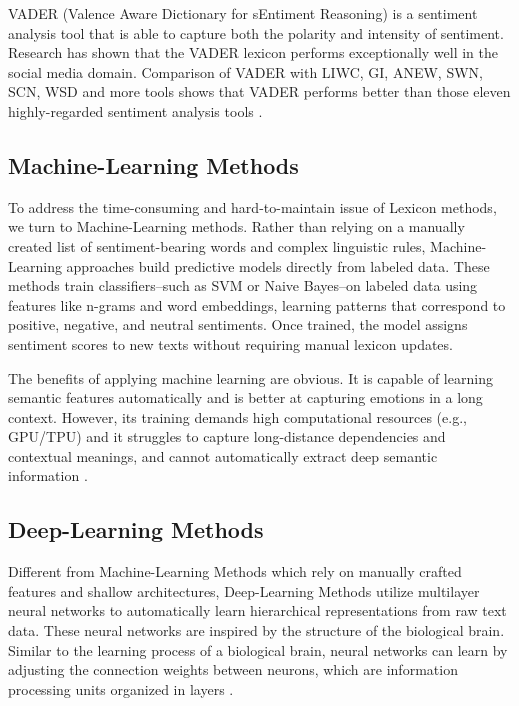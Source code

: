 \documentclass{xum_review}
\begin{document}
VADER (Valence Aware Dictionary for sEntiment Reasoning) is a sentiment analysis
tool that is able to capture both the polarity and intensity of sentiment.
Research has shown that the VADER lexicon performs exceptionally well in the
social media domain. Comparison of VADER with LIWC, GI, ANEW, SWN, SCN, WSD and
more tools shows that VADER performs better than those eleven highly-regarded
sentiment analysis tools \citep{hutto2014vader}.

\subsection{Machine-Learning Methods}

To address the time-consuming and hard-to-maintain issue of Lexicon methods, we
turn to Machine-Learning methods. Rather than relying on a manually created list
of sentiment-bearing words and complex linguistic rules, Machine-Learning
approaches build predictive models directly from labeled data. These methods
train classifiers--such as SVM or Naive Bayes--on labeled data using features like
n-grams and word embeddings, learning patterns that correspond to positive,
negative, and neutral sentiments. Once trained, the model assigns sentiment
scores to new texts without requiring manual lexicon updates. 

The benefits of applying machine learning are obvious. It is capable of learning
semantic features automatically and is better at capturing emotions in a long
context. However, its training demands high computational resources (e.g.,
GPU/TPU) \citep{young2018recent} and it struggles to capture long-distance
dependencies and contextual meanings, and cannot automatically extract deep
semantic information \citep{ribeiro2016why}. 

\subsection{Deep-Learning Methods}

Different from Machine-Learning Methods which rely on manually crafted features
and shallow architectures, Deep-Learning Methods utilize multilayer neural
networks to automatically learn hierarchical representations from raw text data.
These neural networks are inspired by the structure of the biological brain.
Similar to the learning process of a biological brain, neural networks can learn
by adjusting the connection weights between neurons, which are information
processing units organized in layers \citep{lecun2015deep}.
\end{document}
